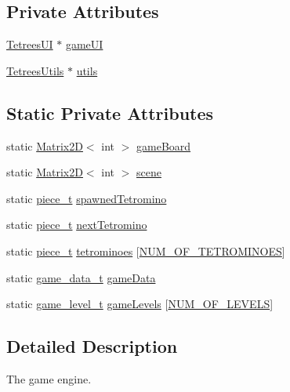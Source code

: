 \subsection*{Private Attributes}
\begin{DoxyCompactItemize}
\item 
\hyperlink{classTetreesUI}{Tetrees\+UI} $\ast$ \hyperlink{classTetreesEngine_a01bf1d438236d5f57129ffb22adf59ce}{game\+UI}
\item 
\hyperlink{classTetreesUtils}{Tetrees\+Utils} $\ast$ \hyperlink{classTetreesEngine_ac4d6256982306ab8a02e18793cb803c0}{utils}
\end{DoxyCompactItemize}
\subsection*{Static Private Attributes}
\begin{DoxyCompactItemize}
\item 
static \hyperlink{classMatrix2D}{Matrix2D}$<$ int $>$ \hyperlink{classTetreesEngine_a37d082a7816d6731b2703dd6d1a1cb97}{game\+Board}
\item 
static \hyperlink{classMatrix2D}{Matrix2D}$<$ int $>$ \hyperlink{classTetreesEngine_aeade477c0bc2eaaa894ebbdaca93584e}{scene}
\item 
static \hyperlink{structpiece__t}{piece\+\_\+t} \hyperlink{classTetreesEngine_a26435ee2f02d9ba70d9e359745114f6e}{spawned\+Tetromino}
\item 
static \hyperlink{structpiece__t}{piece\+\_\+t} \hyperlink{classTetreesEngine_a44c902481f5d8a72ca8a78d24f5c3a33}{next\+Tetromino}
\item 
static \hyperlink{structpiece__t}{piece\+\_\+t} \hyperlink{classTetreesEngine_a07ae13fb62e86b45c834947243a913df}{tetrominoes} \mbox{[}\hyperlink{TetreesDefs_8hpp_a69fa4aa1afe74f7f9ec42bf1e07ddf28}{N\+U\+M\+\_\+\+O\+F\+\_\+\+T\+E\+T\+R\+O\+M\+I\+N\+O\+ES}\mbox{]}
\item 
static \hyperlink{structgame__data__t}{game\+\_\+data\+\_\+t} \hyperlink{classTetreesEngine_afa356b8bb38e8918400e7175d6fbbd2e}{game\+Data}
\item 
static \hyperlink{structgame__level__t}{game\+\_\+level\+\_\+t} \hyperlink{classTetreesEngine_a03ea87d7cefe7b216977c9123fc6ef60}{game\+Levels} \mbox{[}\hyperlink{TetreesDefs_8hpp_a350a4204247d3562e237e289533cc31f}{N\+U\+M\+\_\+\+O\+F\+\_\+\+L\+E\+V\+E\+LS}\mbox{]}
\end{DoxyCompactItemize}


\subsection{Detailed Description}
The game engine. 

